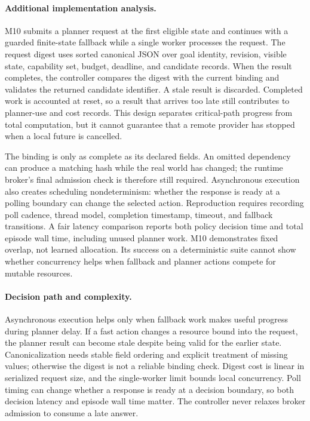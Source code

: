 \paragraph{Additional implementation analysis.} M10 submits a planner request at the first eligible state and continues with a guarded finite-state fallback while a single worker processes the request. The request digest uses sorted canonical JSON over goal identity, revision, visible state, capability set, budget, deadline, and candidate records. When the result completes, the controller compares the digest with the current binding and validates the returned candidate identifier. A stale result is discarded. Completed work is accounted at reset, so a result that arrives too late still contributes to planner-use and cost records. This design separates critical-path progress from total computation, but it cannot guarantee that a remote provider has stopped when a local future is cancelled.

The binding is only as complete as its declared fields. An omitted dependency can produce a matching hash while the real world has changed; the runtime broker's final admission check is therefore still required. Asynchronous execution also creates scheduling nondeterminism: whether the response is ready at a polling boundary can change the selected action. Reproduction requires recording poll cadence, thread model, completion timestamp, timeout, and fallback transitions. A fair latency comparison reports both policy decision time and total episode wall time, including unused planner work. M10 demonstrates fixed overlap, not learned allocation. Its success on a deterministic suite cannot show whether concurrency helps when fallback and planner actions compete for mutable resources.


\paragraph{Decision path and complexity.} Asynchronous execution helps only when fallback work makes useful progress during planner delay. If a fast action changes a resource bound into the request, the planner result can become stale despite being valid for the earlier state. Canonicalization needs stable field ordering and explicit treatment of missing values; otherwise the digest is not a reliable binding check. Digest cost is linear in serialized request size, and the single-worker limit bounds local concurrency. Poll timing can change whether a response is ready at a decision boundary, so both decision latency and episode wall time matter. The controller never relaxes broker admission to consume a late answer.


